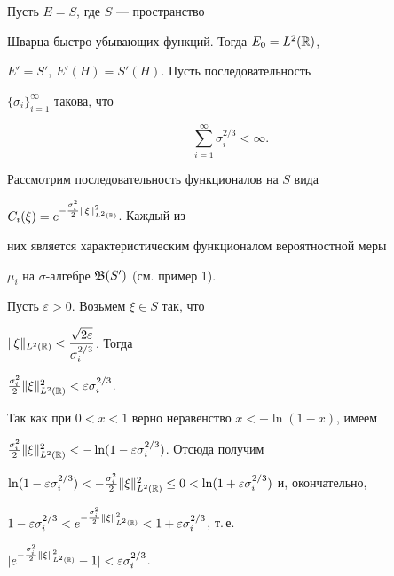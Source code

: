 \begin{exam}


Пусть $E=S$, где $S$ --- пространство


Шварца быстро убывающих функций. Тогда $E_0=L^2(\Bbb{R})$,


$E'=S'$, $E'(H)=S'(H)$. Пусть последовательность


$\{\sigma_i\}_{i=1}^{\infty}$ такова, что


\begin{equation}\label{condsigma}


\sum_{i=1}^{\infty}\sigma_i^{2/3}<\infty.


\end{equation}


Рассмотрим последовательность функционалов на $S$ вида


$C_i(\xi)=e^{-\frac{\sigma_i^2}{2}\|\xi\|_{L^2(\Bbb{R})}^2}$. Каждый из


них является характеристическим функционалом вероятностной меры


$\mu_i$ на $\sigma$-алгебре $\frak{B}(S')$ (см. пример 1).





Пусть $\varepsilon>0$. Возьмем $\xi\in S$ так, что


$\displaystyle\|\xi\|_{L^2(\Bbb{R})}


<\frac{\sqrt{2\varepsilon}}{\sigma_i^{2/3}}$. Тогда


$\frac{\sigma_i^2}{2}\|\xi\|_{L^2(\Bbb{R})}^2<


\varepsilon\sigma_i^{2/3}$.


Так как при $0<x<1$ верно неравенство $x<-\ln(1-x)$, имеем


$\frac{\sigma_i^2}{2}\|\xi\|_{L^2(\Bbb{R})}^2<


-\ln(1-\varepsilon\sigma_i^{2/3})$. Отсюда получим


$\ln(1-\varepsilon\sigma_i^{2/3})<


-\frac{\sigma_i^2}{2}\|\xi\|_{L^2(\Bbb{R})}^2\leq


0<\ln(1+\varepsilon\sigma_i^{2/3})$ и, окончательно,


$1-\varepsilon\sigma_i^{2/3}<e^{-\frac{\sigma_i^2}{2}\|\xi\|_{L^2(\Bbb{R})}^2}<


1+\varepsilon\sigma_i^{2/3}$, т.\,е.


$|e^{-\frac{\sigma_i^2}{2}\|\xi\|_{L^2(\Bbb{R})}^2}-1|<


\varepsilon\sigma_i^{2/3}$.






\end{exam}
